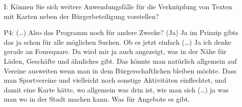 \begin{itemize}
    \item[I:] K{\"o}nnen Sie sich weitere Anwendungsf{\"a}lle f{\"u}r die Verkn{\"u}pfung von Texten mit Karten neben der B{\"u}rgerbeteiligung vorstellen?
    \item[P4:] (\dots) Also das Programm noch f{\"u}r andere Zwecke? (Ja) Ja im Prinzip gibts das ja schon f{\"u}r alle m{\"o}glichen Suchen. Ob es jetzt einfach (\dots) Ja ich denke gerade an Foursquare. Da wird mir ja auch angezeigt, was in der N{\"a}he f{\"u}r L{\"a}den, Gesch{\"a}fte und {\"a}hnliches gibt. Das k{\"o}nnte man nat{\"u}rlich allgemein auf Vereine ausweiten wenn man in dem B{\"u}rgerschaftlichen bleiben m{\"o}chte. Dass man Sportvereine und vielleicht noch sonstige Aktivit{\"a}ten einflechtet, und damit eine Karte h{\"a}tte, wo allgemein was drin ist, wie man sich (\dots) ja was man wo in der Stadt machen kann. Was f{\"u}r Angebote es gibt.
\end{itemize}

